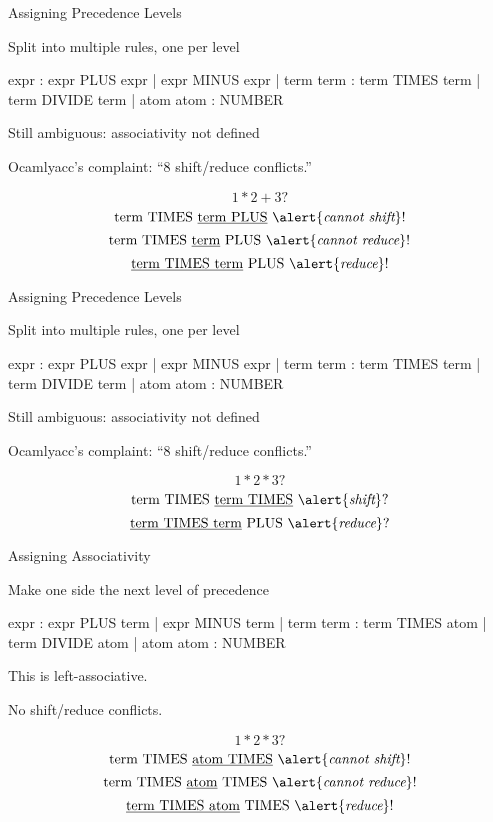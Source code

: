 \documentclass{plt}
\begin{document}
\begin{frame}[fragile]{Assigning Precedence Levels}

Split into multiple rules, one per level

\begin{ocamlyacc}
expr : expr PLUS expr  
     | expr MINUS expr 
     | term            
term : term TIMES term 
     | term DIVIDE term
     | atom            
atom  : NUMBER         
\end{ocamlyacc}

Still ambiguous: associativity not defined

Ocamlyacc's complaint: ``8 shift/reduce conflicts.''

\vspace{-20pt}
$$1 * 2 + 3?$$
$$\text{term  TIMES \underline{term  PLUS} } \alert{\textit{cannot shift}}!$$
$$\text{term  TIMES \underline{term} PLUS } \alert{\textit{cannot reduce}}!$$
$$\text{\underline{term  TIMES term}  PLUS } \alert{\textit{reduce}}!$$
\end{frame}

\begin{frame}[fragile]{Assigning Precedence Levels}

Split into multiple rules, one per level

\begin{ocamlyacc}
expr : expr PLUS expr  
     | expr MINUS expr 
     | term            
term : term TIMES term 
     | term DIVIDE term
     | atom            
atom  : NUMBER         
\end{ocamlyacc}

Still ambiguous: associativity not defined

Ocamlyacc's complaint: ``8 shift/reduce conflicts.''

\vspace{-20pt}
$$1 * 2 * 3?$$
$$\text{term  TIMES \underline{term  TIMES} } \alert{\textit{shift}}?$$
$$\text{\underline{term  TIMES term}  PLUS } \alert{\textit{reduce}}?$$
\end{frame}

\begin{frame}[fragile]{Assigning Associativity}

Make one side the next level of precedence

\begin{ocamlyacc}
expr : expr PLUS term  
     | expr MINUS term 
     | term            
term : term TIMES atom 
     | term DIVIDE atom
     | atom            
atom  : NUMBER         
\end{ocamlyacc}

This is left-associative.

No shift/reduce conflicts.

\vspace{-20pt}
$$1 * 2 * 3?$$
$$\text{term  TIMES \underline{atom  TIMES} } \alert{\textit{cannot shift}}!$$
$$\text{term  TIMES \underline{atom}  TIMES } \alert{\textit{cannot reduce}}!$$
$$\text{\underline{term  TIMES atom}  TIMES } \alert{\textit{reduce}}!$$

\end{frame}
\end{document}
